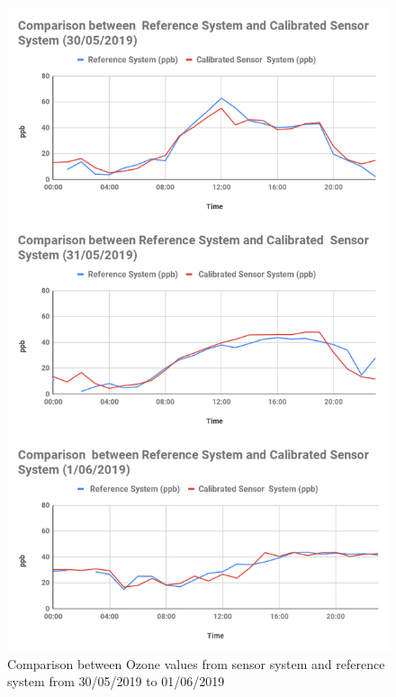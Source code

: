   \begin{figure}[h]
    \begin{center}
    \includegraphics[scale=0.46]{images/figure83oz.png}
    \end{center}
    \caption{Comparison between Ozone values from sensor system and reference system from 30/05/2019 to 01/06/2019}
    \label{Ozone}
  
  
  \end{figure}



